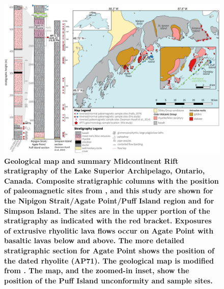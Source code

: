 \documentclass[11pt,letterpaper]{article}
\begin{document}
\begin{figure}[!h]
\centering
\includegraphics[width=6.5 in]{Figures/Fig4_Osler_map.pdf}
\caption{\small{\textbf{Geological map and summary Midcontinent Rift stratigraphy of the Lake Superior Archipelago, Ontario, Canada. Composite stratigraphic columns with the position of paleomagnetic sites from \cite{Halls1974a}, \cite{Swanson-Hysell2014b} and this study are shown for the Nipigon Strait/Agate Point/Puff Island region and for Simpson Island. The \cite{Halls1974a} sites are in the upper portion of the stratigraphy as indicated with the red bracket. Exposures of extrusive rhyolitic lava flows occur on Agate Point with basaltic lavas below and above. The more detailed stratigraphic section for Agate Point shows the position of the dated rhyolite (AP71). The geological map is modified from \cite{Carter1973a}. The map, and the zoomed-in inset, show the position of the Puff Island unconformity and sample sites.}}}
\label{fig:Osler_Map}
\end{figure}
\end{document}
